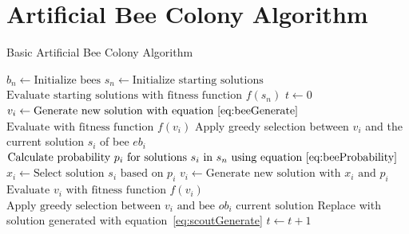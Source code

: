 \section{Artificial Bee Colony Algorithm}
\label{sec:BEE}
\begin{algorithm}
\caption{Basic Artificial Bee Colony Algorithm\cite{ABCCompareStudy}}
\label{alg:ABC}
	\begin{algorithmic}[1]
		\STATE$b_n \leftarrow \text{Initialize bees}$
		\STATE$s_n \leftarrow \text{Initialize starting solutions}$
		\STATE$\text{Evaluate starting solutions with fitness function $f(s_n)$}$
		\STATE$t \leftarrow 0$
				\STATE$v_i \leftarrow \text{Generate new solution with equation~\ref{eq:beeGenerate}}$
				\STATE$\text{Evaluate with fitness function $f(v_i)$}$
				\STATE Apply greedy selection between $v_i$ and the current solution $s_i$ of bee $eb_i$
			\ENDFOR
			\STATE$\text{Calculate probability $p_i$ for solutions $s_i$ in $s_n$ using equation~\ref{eq:beeProbability}}$
				\STATE$x_i \leftarrow \text{Select solution $s_i$ based on $p_i$} $
				\STATE$v_i \leftarrow \text{Generate new solution with $x_i$ and $p_i$}$
				\STATE$\text{Evaluate $v_i$ with fitness function $f(v_i)$}$
				\STATE$\text{Apply greedy selection between $v_i$ and bee $ob_i$ current solution}$
			\ENDFOR
				\STATE Replace with solution generated with equation~\ref{eq:scoutGenerate}
			\ENDIF
			\STATE$t \leftarrow t + 1$
		\ENDWHILE
	\end{algorithmic}
\end{algorithm}
